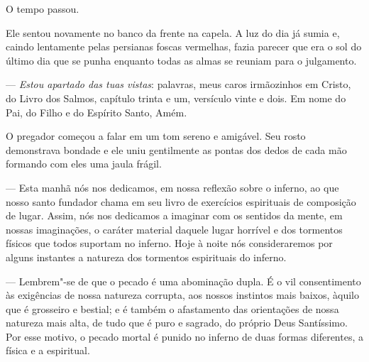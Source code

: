 O tempo passou.

Ele sentou novamente no banco da frente na capela. A luz do dia já sumia
e, caindo lentamente pelas persianas foscas vermelhas, fazia parecer
que era o sol do último dia que se punha enquanto todas as almas se
reuniam para o julgamento.

 --- \textit{Estou apartado das tuas vistas}: palavras, meus caros
irmãozinhos em Cristo, do Livro dos Salmos, capítulo trinta e um,
versículo vinte e dois. Em nome do Pai, do Filho e do Espírito Santo,
Amém.

O pregador começou a falar em um tom sereno e amigável. Seu rosto
demonstrava bondade e ele uniu gentilmente as pontas dos dedos de cada
mão formando com eles uma jaula frágil.

 --- Esta manhã nós nos dedicamos, em nossa reflexão sobre o inferno, ao
que nosso santo fundador chama em seu livro de exercícios espirituais
de composição de lugar. Assim, nós nos dedicamos a imaginar com os
sentidos da mente, em nossas imaginações, o caráter material daquele
lugar horrível e dos tormentos físicos que todos suportam no inferno.
Hoje à noite nós consideraremos por alguns instantes a natureza dos
tormentos espirituais do inferno.

 --- Lembrem"-se de que o pecado é uma abominação dupla. É o vil
consentimento às exigências de nossa natureza corrupta, aos nossos
instintos mais baixos, àquilo que é grosseiro e bestial; e é também o
afastamento das orientações de nossa natureza mais alta, de tudo que é
puro e sagrado, do próprio Deus Santíssimo. Por esse motivo, o pecado
mortal é punido no inferno de duas formas diferentes, a física e a
espiritual.

